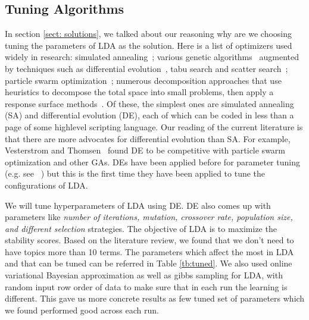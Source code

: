 \documentclass[conference]{IEEEtran}
\theoremstyle{break}
\begin{document}
\subsection{Tuning Algorithms}
\label{sect: tuning}

In section \ref{sect: solutions}, we talked about our reasoning why are we choosing tuning the parameters of LDA as the solution. Here is a list of optimizers used widely in research: simulated annealing~\cite{feather2002converging, menzies2007business}; various genetic algorithms~\cite{goldberg1979complexity} augmented by techniques such as differential evolution~\cite{storn1997differential}, tabu search and scatter search~\cite{glover1986general, beausoleil2006moss, molina2007sspmo, nebro2008abyss}; particle swarm optimization~\cite{pan2008particle}; numerous decomposition approaches that use heuristics to decompose the total space into small problems, then apply a response surface methods~\cite{krall2015gale, zuluaga2013active}. Of these, the simplest ones are simulated annealing (SA) and differential evolution (DE), each of which can be coded in less than a page of some highlevel scripting language. Our reading of the current literature is that there are more advocates for differential evolution than SA. For example, Vesterstrom and Thomsen~\cite{vesterstrom2004comparative} found DE to be competitive with particle swarm optimization and other GAs. DEs have been applied before for parameter tuning (e.g. see~\cite{omran2005differential, chiha2012tuning, fu2016tuning} ) but this is the first time they have been applied to tune the configurations of LDA.

We will tune hyperparameters of LDA using DE. DE also comes up with parameters like \textit{number of iterations, mutation, crossover rate, population size, and different selection} strategies. The objective of LDA is to maximize the stability scores. Based on the literature review, we found that we don't need to have topics more than 10 terms. The parameters which affect the most in LDA and that can be tuned can be referred in Table \ref{tb:tuned}. We also used online variational Bayesian approximation as well as gibbs sampling for LDA, with random input row order of data to make sure that in each run the learning is different. This gave us more concrete results as few tuned set of parameters which we found performed good across each run.
\end{document}
